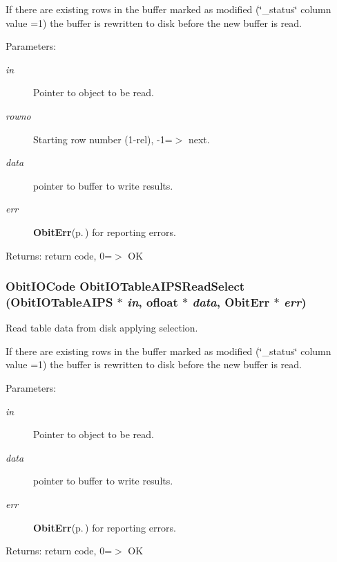 If there are existing rows in the buffer marked as modified (\char`\"{}\_\-status\char`\"{} column value =1) the buffer is rewritten to disk before the new buffer is read. \begin{Desc}
\item[Parameters:]
\begin{description}
\item[{\em in}]Pointer to object to be read. \item[{\em rowno}]Starting row number (1-rel), -1=$>$ next. \item[{\em data}]pointer to buffer to write results. \item[{\em err}]{\bf Obit\-Err}{\rm (p.\,\pageref{structObitErr})} for reporting errors. \end{description}
\end{Desc}
\begin{Desc}
\item[Returns:]return code, 0=$>$ OK \end{Desc}
\subsubsection{\setlength{\rightskip}{0pt plus 5cm}Obit\-IOCode Obit\-IOTable\-AIPSRead\-Select ({\bf Obit\-IOTable\-AIPS} $\ast$ {\em in}, {\bf ofloat} $\ast$ {\em data}, {\bf Obit\-Err} $\ast$ {\em err})}\label{ObitIOTableAIPS_8c_a20}


Read table data from disk applying selection. 

If there are existing rows in the buffer marked as modified (\char`\"{}\_\-status\char`\"{} column value =1) the buffer is rewritten to disk before the new buffer is read. \begin{Desc}
\item[Parameters:]
\begin{description}
\item[{\em in}]Pointer to object to be read. \item[{\em data}]pointer to buffer to write results. \item[{\em err}]{\bf Obit\-Err}{\rm (p.\,\pageref{structObitErr})} for reporting errors. \end{description}
\end{Desc}
\begin{Desc}
\item[Returns:]return code, 0=$>$ OK \end{Desc}
